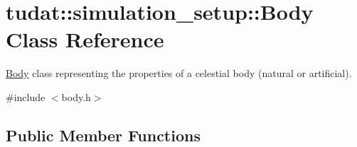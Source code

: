 \hypertarget{classtudat_1_1simulation__setup_1_1Body}{}\section{tudat\+:\+:simulation\+\_\+setup\+:\+:Body Class Reference}
\label{classtudat_1_1simulation__setup_1_1Body}


\hyperlink{classtudat_1_1simulation__setup_1_1Body}{Body} class representing the properties of a celestial body (natural or artificial).  




{\ttfamily \#include $<$body.\+h$>$}

\subsection*{Public Member Functions}
